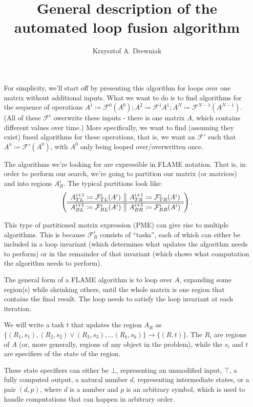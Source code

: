 \documentclass[12pt,letterpaper]{article}
\title{General description of the automated loop fusion algorithm}
\author{Krzysztof A. Drewniak}
\newcommand*{\opf}{\mathcal{F}}
\begin{document}
\maketitle{}

For simplicity, we'll start off by presenting this algorithm for loops over one matrix without additional inputs.
What we want to do is to find algorithms for the sequence of operations $A^1 \coloneqq \opf^0(A^0); A^2 \coloneqq \opf^1{A^1}; A^N \coloneqq \opf^{N - 1}(A^{N - 1})$.
(All of these $\opf^i$ owerwrite these inputs - there is one matrix $A$, which contains different values over time.)
More specifically, we want to find (assuming they exist) fused algorithms for these operations, that is, we want an $\opf'$ such that $A^n \coloneqq \opf'(A^0)$, with $A^0$ only being looped over/overwritten once.

The algorithms we're looking for are expressible in FLAME notation.
That is, in order to perform our search, we're going to partition our matrix (or matrices) and into regions $A_R^i$.
The typical partitions look like:
\begin{equation*}
  \FlaTwoByTwo{A^{i + 1}_{TL} \coloneqq \opf^i_{TL}(A^i)}{A^{i + 1}_{TR} \coloneqq \opf^i_{TR}(A^i)}
              {A^{i + 1}_{BL} \coloneqq \opf^i_{BL}(A^i)}{A^{i + 1}_{BR} \coloneqq \opf^i_{BR}(A^i)}.
\end{equation*}

This type of partitioned matrix expression (PME) can give rise to multiple algorithms.
This is because $\opf^i_R$ consists of ``tasks'', each of which can either be included in a loop invariant (which determines what updates the algorithm needs to perform) or in the remainder of that invariant (which shows what computation the algorithm needs to perform).

The general form of a FLAME algorithm is to loop over $A$, expanding some region(s) while shrinking others, until the whole matrix is one region that contains the final result.
The loop needs to satisfy the loop invariant at each iteration.

We will write a task $t$ that updates the region $A_R$ as $\{(R_1, s_1), (R_2, s_2) \vee (R_3, s_3), \ldots (R_k, s_k)\} \to \{(R, t)\}$.
The $R_i$ are regions of $A$ (or, more generally, regions of any object in the problem), while the $s_i$ and $t$ are specifiers of the state of the region.

These state specifiers can either be $\bot$, representing an unmodified input, $\top$, a fully computed output, a natural number $d$, representing intermediate states, or a pair $(d, p)$, where $d$ is a number and $p$ is an arbitrary symbol, which is used to handle computations that can happen in arbitrary order.
\end{document}
